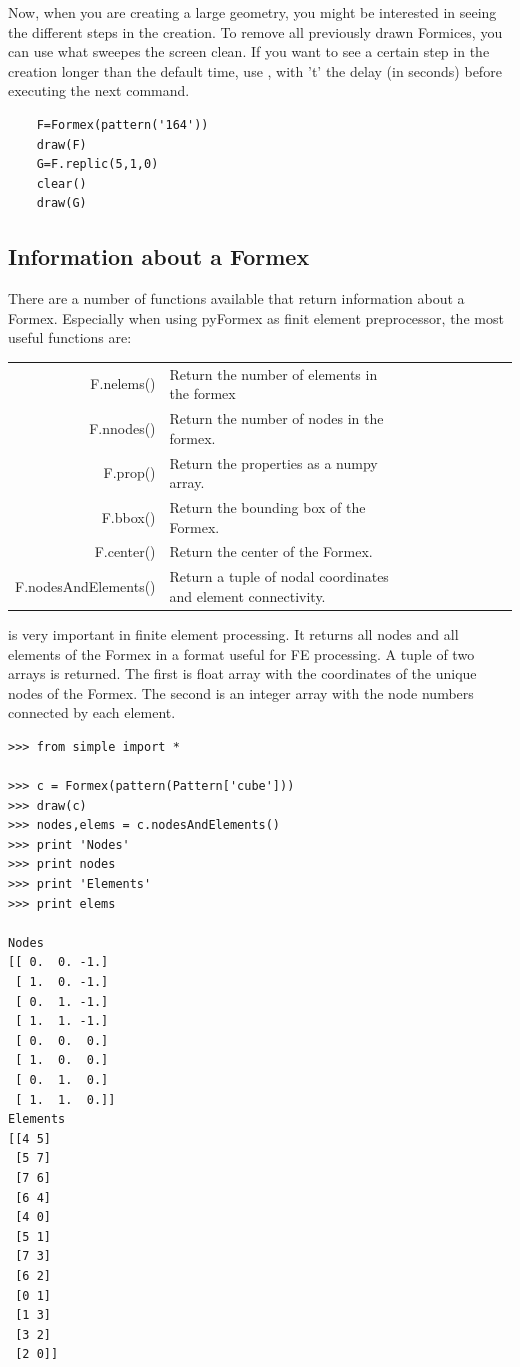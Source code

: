 \documentclass[a4paper]{manual}
\newcommand{\pyformex}{pyFormex\xspace}
\begin{document}
{Now, when you are creating a large geometry, you might be interested in seeing the different steps in the creation. To remove all previously drawn Formices, you can use   what sweepes the screen clean. If you want to see a certain step in the creation longer than the default time, use , with 't' the delay (in seconds) before executing the next command.
\begin{verbatim}
	F=Formex(pattern('164'))
	draw(F)
	G=F.replic(5,1,0)
	clear()
	draw(G)
\end{verbatim}


\subsection{Information about a Formex}
\label{subsec:info}
There are a number of functions available that return information about a Formex. Especially when using \pyformex as finit element preprocessor, the most useful functions are:
\begin{table}[h]
	\begin{tabular}{*{5}{rl}}
F.nelems()				& Return the number of elements in the formex\\
F.nnodes() 			& Return the number of nodes in the formex.\\
F.prop() 				& Return the properties as a numpy array.\\
F.bbox()				& Return the bounding box of the Formex.\\
F.center()				& Return the center of the Formex.\\
F.nodesAndElements() 	& Return a tuple of nodal coordinates and element connectivity.\\
	\end {tabular}
\end{table}

 is very important in finite element processing. It returns all nodes and all elements of the Formex in a format useful for FE processing. A tuple of two arrays is returned. The first is float array with the coordinates of the unique nodes of the Formex. The second is an integer array with the node numbers connected by each element.
\begin{verbatim}
>>> from simple import *

>>> c = Formex(pattern(Pattern['cube']))
>>> draw(c)
>>> nodes,elems = c.nodesAndElements()
>>> print 'Nodes'
>>> print nodes
>>> print 'Elements'
>>> print elems

Nodes
[[ 0.  0. -1.]
 [ 1.  0. -1.]
 [ 0.  1. -1.]
 [ 1.  1. -1.]
 [ 0.  0.  0.]
 [ 1.  0.  0.]
 [ 0.  1.  0.]
 [ 1.  1.  0.]]
Elements
[[4 5]
 [5 7]
 [7 6]
 [6 4]
 [4 0]
 [5 1]
 [7 3]
 [6 2]
 [0 1]
 [1 3]
 [3 2]
 [2 0]]
\end{verbatim}

}
\end{document}
